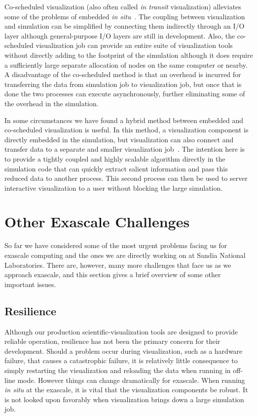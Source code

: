 \documentclass[conference]{IEEEtran}
\newcommand*{\lcite}[1]{~\cite{#1}}
\newcommand{\insitu}{{\it in situ}\xspace}
\newcommand{\intransit}{{\it in transit}\xspace}
\begin{document}
Co-scheduled visualization (also often called \intransit visualization)
alleviates some of the problems of embedded
\insitu\lcite{Moreland2011:PDAC,Biddiscombe2012,Klasky2011}.  The coupling
between visualization and simulation can be simplified by connecting them
indirectly through an I/O layer although general-purpose I/O layers are
still in development.  Also, the co-scheduled visualization job can provide
an entire suite of visualization tools without directly adding to the
footprint of the simulation although it does require a sufficiently large
separate allocation of nodes on the same computer or nearby.  A
disadvantage of the co-scheduled method is that an overhead is incurred for
transferring the data from simulation job to visualization job, but once
that is done the two processes can execute asynchronously, further
eliminating some of the overhead in the simulation.

In some circumstances we have found a hybrid method between embedded and
co-scheduled visualization is useful.  In this method, a visualization
component is directly embedded in the simulation, but visualization can
also connect and transfer data to a separate and smaller visualization
job\lcite{Moreland2011:PDAC}.  The intention here is to provide a tightly
coupled and highly scalable algorithm directly in the simulation code that
can quickly extract salient information and pass this reduced data to
another process.  This second process can then be used to server
interactive visualization to a user without blocking the large simulation.

\section{Other Exascale Challenges}
\label{sec:Other}

\noindent
So far we have considered some of the most urgent problems facing us for
exascale computing and the ones we are directly working on at Sandia
National Laboratories.  There are, however, many more challenges that face
us as we approach exascale, and this section gives a brief overview of some
other important issues.

\subsection{Resilience}

\noindent
Although our production scientific-visualization tools are designed to
provide reliable operation, resilience has not been the primary concern for
their development.  Should a problem occur during visualization, such as a
hardware failure, that causes a catastrophic failure, it is relatively
little consequence to simply restarting the visualization and reloading the
data when running in off-line mode.  However things can change dramatically
for exascale.  When running \insitu at the exascale, it is vital that the
visualization components be robust.  It is not looked upon favorably when
visualization brings down a large simulation job.
\end{document}
